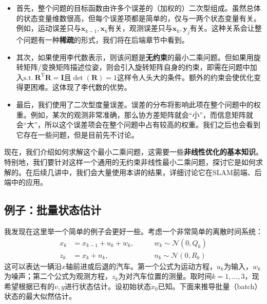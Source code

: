 \begin{itemize}
	\item 首先，整个问题的目标函数由许多个误差的（加权的）二次型组成。虽然总体的状态变量维数很高，但每个误差项都是简单的，仅与一两个状态变量有关。例如，运动误差只与$\bm{x}_{k-1}, \bm{x}_k$有关，观测误差只与$\bm{x}_k, \bm{y}_j$有关。这种关系会让整个问题有一种\textbf{稀疏}的形式，我们将在后端章节中看到。
	
	\item 其次，如果使用李代数表示，则该问题是\textbf{无约束}的最小二乘问题。但如果用旋转矩阵/变换矩阵描述位姿，则会引入旋转矩阵自身的约束，即需在问题中加入$\mathrm{s.t.}\ \bm{R}^\mathrm{T} \bm{R}=\bm{I} \text{且} \det (\bm{R})=1$这样令人头大的条件。额外的约束会使优化变得更困难。这体现了李代数的优势。
	
	\item 最后，我们使用了二次型度量误差。误差的分布将影响此项在整个问题中的权重。例如，某次的观测非常准确，那么协方差矩阵就会“小”，而信息矩阵就会“大”，所以这个误差项会在整个问题中占有较高的权重。我们之后也会看到它存在一些问题，但是目前先不讨论。
\end{itemize}

现在，我们介绍如何求解这个最小二乘问题，这需要一些\textbf{非线性优化的基本知识}。特别地，我们要针对这样一个通用的无约束非线性最小二乘问题，探讨它是如何求解的。在后续几讲中，我们会大量使用本讲的结果，详细讨论它在SLAM前端、后端中的应用。

\subsection{例子：批量状态估计}
我发现在这里举一个简单的例子会更好一些。考虑一个非常简单的离散时间系统：
\begin{equation}
\begin{array}{lll}
{x_k} &= {x_{k - 1}} + {u_k} + {w_k},&\qquad w_k \sim \mathcal{N}\left( {0,Q_k} \right)\\
{z_k} &= {x_k} + {n_k},&\qquad {n_k}\sim \mathcal{N}\left( {0,R_k} \right)
\end{array}
\end{equation}
这可以表达一辆沿$x$轴前进或后退的汽车。第一个公式为运动方程，$u_k$为输入，$w_k$为噪声；第二个公式为观测方程，$z_k$为对汽车位置的测量。取时间$k=1,\ldots,3$，现希望根据已有的$v,y$进行状态估计。设初始状态$x_0$已知。下面来推导批量（batch）状态的最大似然估计。

